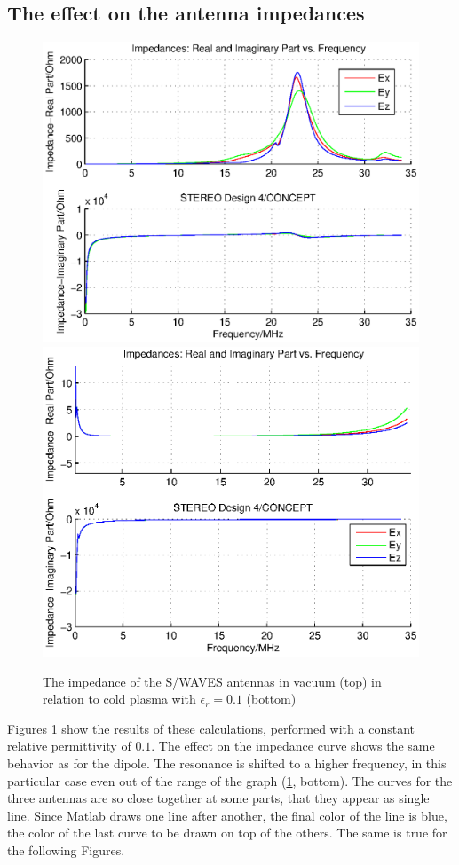 \documentclass[a4paper,11pt]{thesis}
\begin{document}
\subsection{The effect on the antenna impedances}

\begin{figure}
\begin{center}
  \includegraphics[width=11.5cm]{DissPics/impedance_stereo_vac.eps}
\includegraphics[width=11.5cm]{DissPics/impedance_stereo_pl.eps}
  \caption{The impedance of the S/WAVES antennas in vacuum (top) in relation to cold plasma with $\epsilon_r=0.1$ (bottom)}\label{fig:imp_stereo}
  \end{center}
\end{figure}

Figures \ref{fig:imp_stereo} show the results of these calculations, performed with a constant relative permittivity of $0.1$. The effect on the impedance curve shows the same behavior as for the dipole. The resonance is shifted to a higher frequency, in this particular case even out of the range of the graph (\ref{fig:imp_stereo}, bottom). The curves for the three antennas are so close together at some parts, that they appear as single line. Since Matlab draws one line after another, the final color of the line is blue, the color of the last curve to be drawn on top of the others. The same is true for the following Figures.\\
\end{document}
